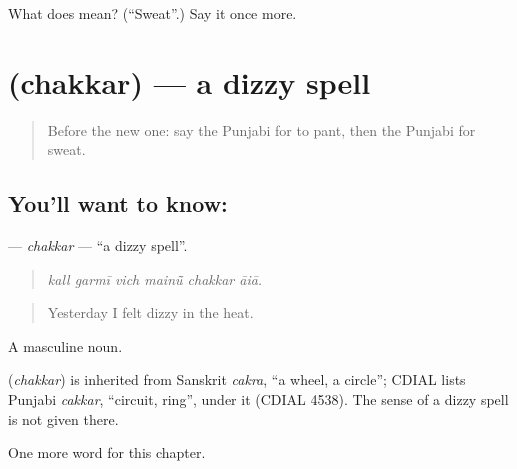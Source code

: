 \begin{tcolorbox}[breakable,colback=teal!4,colframe=teal!35!black,title={Before you move on}]
What does  mean? (\textquotedblleft{}Sweat\textquotedblright{}.) Say it once more.
\end{tcolorbox}
\section[\texorpdfstring{\pa{ਚੱਕਰ} (chakkar)}{ਚੱਕਰ (chakkar)}]{ (chakkar) — a dizzy spell}

\label{lesson:PA-C324-chakkar}



\begin{quote}
Before the new one: say the Punjabi for to pant, then the Punjabi for sweat.
\end{quote}

\subsection*{You'll want to know: }
\textbf{} — \emph{chakkar} — \textquotedblleft{}a dizzy spell\textquotedblright{}.

\begin{quote}
     
\end{quote}

\begin{quote}
\emph{kall garmī vich mainū̃ chakkar āiā.}
\end{quote}

\begin{quote}
Yesterday I felt dizzy in the heat.
\end{quote}

A masculine noun.

\begin{cousinweb}
\textbf{} (\emph{chakkar}) is inherited from Sanskrit \emph{cakra}, \textquotedblleft{}a wheel, a circle\textquotedblright{}; CDIAL lists Punjabi \emph{cakkar}, \textquotedblleft{}circuit, ring\textquotedblright{}, under it (CDIAL 4538). The sense of a dizzy spell is not given there.
\end{cousinweb}

\begin{grammarlens}[title={What you've built}]
One more word for this chapter.
\end{grammarlens}

